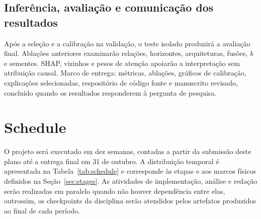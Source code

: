 \documentclass[conference]{IEEEtran}
\begin{document}
\subsection{Inferência, avaliação e comunicação dos resultados}

Após a seleção e a calibração na validação, o teste isolado produzirá a avaliação final. Ablações anteriores examinarão relações, horizontes, arquiteturas, fusões, $k$ e sementes. SHAP, vizinhos e pesos de atenção apoiarão a interpretação sem atribuição causal. Marco de entrega: métricas, ablações, gráficos de calibração, explicações selecionadas, respositório de código fonte \cite{gnnriskcreditcarddefault2026} e manuscrito revisado, concluído quando os resultados responderem à pergunta de pesquisa.

\section{Schedule}
\label{sec:schedule}

O projeto será executado em dez semanas, contadas a partir da submissão deste plano até a entrega final em 31 de outubro. A distribuição temporal é apresentada na Tabela~\ref{tab:schedule} e corresponde às etapas e aos marcos físicos definidos na Seção~\ref{sec:stages}. As atividades de implementação, análise e redação serão realizadas em paralelo quando não houver dependência entre elas, outrossim, os checkpoints da disciplina serão atendidos pelos artefatos produzidos ao final de cada período.
\end{document}
